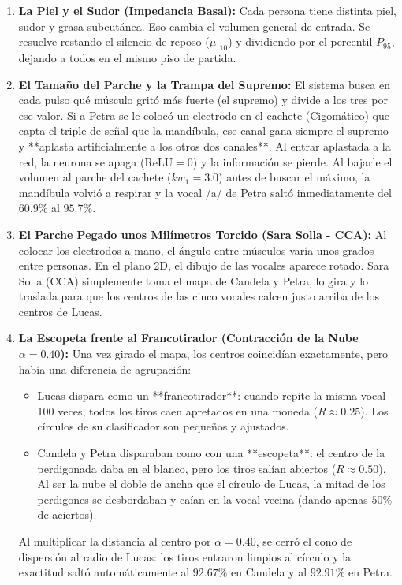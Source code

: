 \documentclass[11pt,a4paper]{article}
\begin{document}
\begin{enumerate}
    \item \textbf{La Piel y el Sudor (Impedancia Basal):} Cada persona tiene distinta piel, sudor y grasa subcutánea. Eso cambia el volumen general de entrada. Se resuelve restando el silencio de reposo ($\mu_{:10}$) y dividiendo por el percentil $P_{95}$, dejando a todos en el mismo piso de partida.
    \item \textbf{El Tamaño del Parche y la Trampa del Supremo:} El sistema busca en cada pulso qué músculo gritó más fuerte (el supremo) y divide a los tres por ese valor. Si a Petra se le colocó un electrodo en el cachete (Cigomático) que capta el triple de señal que la mandíbula, ese canal gana siempre el supremo y **aplasta artificialmente a los otros dos canales**. Al entrar aplastada a la red, la neurona se apaga ($\text{ReLU} = 0$) y la información se pierde. Al bajarle el volumen al parche del cachete ($kw_1 = 3.0$) antes de buscar el máximo, la mandíbula volvió a respirar y la vocal /a/ de Petra saltó inmediatamente del $60.9\%$ al $\mathbf{95.7\%}$.
    \item \textbf{El Parche Pegado unos Milímetros Torcido (Sara Solla - CCA):} Al colocar los electrodos a mano, el ángulo entre músculos varía unos grados entre personas. En el plano 2D, el dibujo de las vocales aparece rotado. Sara Solla (CCA) simplemente toma el mapa de Candela y Petra, lo gira y lo traslada para que los centros de las cinco vocales calcen justo arriba de los centros de Lucas.
    \item \textbf{La Escopeta frente al Francotirador (Contracción de la Nube $\alpha = 0.40$):} Una vez girado el mapa, los centros coincidían exactamente, pero había una diferencia de agrupación:
    \begin{itemize}
        \item Lucas dispara como un **francotirador**: cuando repite la misma vocal 100 veces, todos los tiros caen apretados en una moneda ($R \approx 0.25$). Los círculos de su clasificador son pequeños y ajustados.
        \item Candela y Petra disparaban como con una **escopeta**: el centro de la perdigonada daba en el blanco, pero los tiros salían abiertos ($R \approx 0.50$). Al ser la nube el doble de ancha que el círculo de Lucas, la mitad de los perdigones se desbordaban y caían en la vocal vecina (dando apenas $50\%$ de aciertos).
    \end{itemize}
    Al multiplicar la distancia al centro por $\alpha = 0.40$, se cerró el cono de dispersión al radio de Lucas: los tiros entraron limpios al círculo y la exactitud saltó automáticamente al $\mathbf{92.67\%}$ en Candela y al $\mathbf{92.91\%}$ en Petra.
\end{enumerate}
\end{document}

